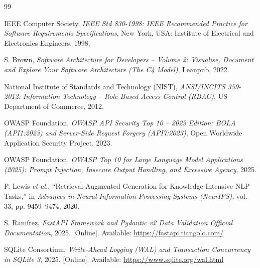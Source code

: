 \begin{thebibliography}{99}

IEEE Computer Society, \textit{IEEE Std 830-1998: IEEE Recommended Practice for Software Requirements Specifications}, New York, USA: Institute of Electrical and Electronics Engineers, 1998.

S. Brown, \textit{Software Architecture for Developers -- Volume 2: Visualise, Document and Explore Your Software Architecture (The C4 Model)}, Leanpub, 2022.

National Institute of Standards and Technology (NIST), \textit{ANSI/INCITS 359-2012: Information Technology -- Role Based Access Control (RBAC)}, US Department of Commerce, 2012.

OWASP Foundation, \textit{OWASP API Security Top 10 -- 2023 Edition: BOLA (API1:2023) and Server-Side Request Forgery (API7:2023)}, Open Worldwide Application Security Project, 2023.

OWASP Foundation, \textit{OWASP Top 10 for Large Language Model Applications (2025): Prompt Injection, Insecure Output Handling, and Excessive Agency}, 2025.

P. Lewis \textit{et al.}, ``Retrieval-Augmented Generation for Knowledge-Intensive NLP Tasks,'' in \textit{Advances in Neural Information Processing Systems (NeurIPS)}, vol. 33, pp. 9459--9474, 2020.

S. Ramírez, \textit{FastAPI Framework and Pydantic v2 Data Validation Official Documentation}, 2025. [Online]. Available: \url{https://fastapi.tiangolo.com/}

SQLite Consortium, \textit{Write-Ahead Logging (WAL) and Transaction Concurrency in SQLite 3}, 2025. [Online]. Available: \url{https://www.sqlite.org/wal.html}

\end{thebibliography}
